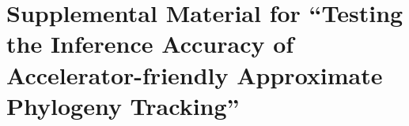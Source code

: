 \section*{Supplemental Material for ``Testing the Inference Accuracy of Accelerator-friendly Approximate Phylogeny Tracking''}







% 

% 
% 
% 
